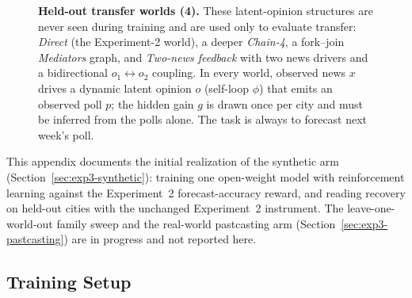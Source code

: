\documentclass{article} %
\begin{document}
\begin{figure}[t]
{}
  \caption{\textbf{Held-out transfer worlds (4).} These latent-opinion structures are never seen during
training and are used only to evaluate transfer: \emph{Direct} (the Experiment-2 world), a deeper
\emph{Chain-4}, a fork--join \emph{Mediators} graph, and \emph{Two-news feedback} with two news
drivers and a bidirectional $o_1\!\leftrightarrow\!o_2$ coupling. In every world, observed news $x$
drives a dynamic latent opinion $o$ (self-loop $\phi$) that emits an observed poll $p$; the
\textcolor{teal!65!black}{hidden gain $g$} is drawn once per city and must be inferred from the polls
alone. The task is always to forecast next week's poll.}
\label{fig:exp3-heldout}
\end{figure}





This appendix documents the initial realization of the synthetic arm
(Section~\ref{sec:exp3-synthetic}): training one open-weight model with reinforcement learning
against the Experiment~2 forecast-accuracy reward, and reading recovery on held-out cities with the
unchanged Experiment~2 instrument.  The leave-one-world-out family sweep and the real-world
pastcasting arm (Section~\ref{sec:exp3-pastcasting}) are in progress and not reported here.

\subsection{Training Setup}
\label{app:exp3-train}
\end{document}
